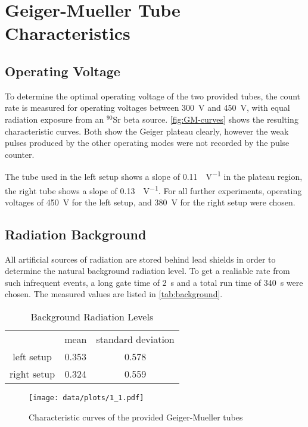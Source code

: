 \chapter{Geiger-Mueller Tube Characteristics}
\section{Operating Voltage}
To determine the optimal operating voltage of the two provided tubes, the count rate is measured for operating voltages between \SI{300}{\volt} and \SI{450}{\volt}, with equal radiation exposure from an $^{90}$Sr beta source.
\autoref{fig:GM-curves} shows the resulting characteristic curves.
Both show the Geiger plateau clearly, however the weak pulses produced by the other operating modes were not recorded by the pulse counter.

The tube used in the left setup shows a slope of \SI{0.11}{\cps\per\volt} in the plateau region, the right tube shows a slope of \SI{0.13}{\cps\per\volt}.
For all further experiments, operating voltages of \SI{450}{\volt} for the left setup, and \SI{380}{\volt} for the right setup were chosen.

\section{Radiation Background}
All artificial sources of radiation are stored behind lead shields in order to determine the natural background radiation level.
To get a realiable rate from such infrequent events, a long gate time of \SI{2}{\second} and a total run time of \SI{340}{\second} were chosen.
The measured values are listed in \autoref{tab:background}.

\begin{table}[b!]\centering
	\caption{Background Radiation Levels}
	\label{tab:background}
	\begin{tabular}{ccc}
		&	mean& standard deviation\\
		left setup&	\SI{0.353}{\cps}&	\SI{0.578}{\cps}\\
		right setup&	\SI{0.324}{\cps}&	\SI{0.559}{\cps}\\
	\end{tabular}
\end{table}

\begin{figure}[b!]
	\centering
	\texttt{[image: data/plots/1\_1.pdf]}
	\caption{Characteristic curves of the provided Geiger-Mueller tubes}
	\label{fig:GM-curves}
\end{figure}


